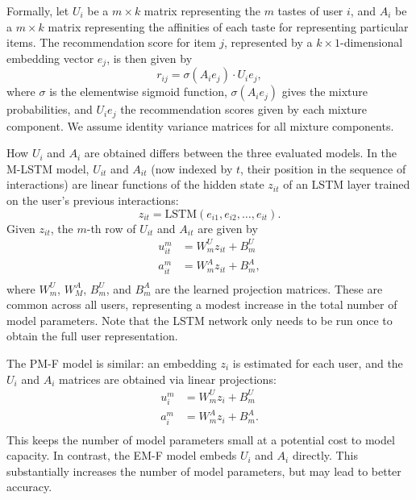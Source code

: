 \documentclass[sigconf]{acmart}
\begin{document}
Formally, let $U_i$ be a $m \times k$ matrix representing the $m$ tastes of user $i$, and $A_i$ be a $m \times k$ matrix representing the affinities of each taste for representing particular items. The recommendation score for item $j$, represented by a $k \times 1$-dimensional embedding vector $e_j$, is then given by
\begin{equation}
  r_{ij} = \sigma\left(A_ie_j\right) \cdot U_ie_j,
\end{equation}
where $\sigma$ is the elementwise sigmoid function, $\sigma\left(A_ie_j\right)$ gives the mixture probabilities, and $U_ie_j$ the recommendation scores given by each mixture component. We assume identity variance matrices for all mixture components.

How $U_i$ and $A_i$ are obtained differs between the three evaluated models. In the M-LSTM model, $U_{it}$ and $A_{it}$ (now indexed by $t$, their position in the sequence of interactions) are linear functions of the hidden state $z_{it}$ of an LSTM layer trained on the user's previous interactions:
\begin{equation}
  \label{eq:lstm}
  z_{it} = \mathrm{LSTM}\left(e_{i1}, e_{i2}, \ldots, e_{it}\right).
\end{equation}
Given $z_{it}$, the $m$-th row of $U_{it}$ and $A_{it}$ are given by
\begin{equation}
\begin{aligned}
  u^m_{it} &= W^U_mz_{it} + B^U_m\\
  a^m_{it} &= W^A_mz_{it} + B^A_m,\\
\end{aligned}
\end{equation}
where $W^U_m$, $W^A_M$, $B^U_m$, and $B^A_m$ are the learned projection matrices. These are common across all users, representing a modest increase in the total number of model parameters. Note that the LSTM network only needs to be run once to obtain the full user representation.

The PM-F model is similar: an embedding $z_i$ is estimated for each user, and the $U_i$ and $A_i$ matrices are obtained via linear projections:
\begin{equation}
\begin{aligned}
  u^m_{i} &= W^U_mz_{i} + B^U_m\\
  a^m_{i} &= W^A_mz_{i} + B^A_m.\\
\end{aligned}
\end{equation}
This keeps the number of model parameters small at a potential cost to model capacity. In contrast, the EM-F model embeds $U_i$ and $A_i$ directly. This substantially increases the number of model parameters, but may lead to better accuracy.
\end{document}
